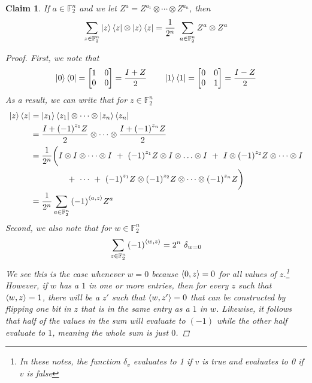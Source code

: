 \message{ !name(report_1.tex)}\documentclass[11pt]{article}
\newtheorem{claim}[thm]{Claim}
\theoremstyle{definition}
\theoremstyle{plain}
\begin{document}
\begin{claim}
If $a \in \mathbb{F}_2^n$ and we let $Z^a = Z^{a_1} \otimes \cdots \otimes Z^{a_n}$, then 
\begin{equation}\label{prelim_2}
  \sum\limits_{z \in \mathbb{F}_2^n} \ket{z} \bra{z} \otimes \ket{z} \bra{z}
  = \frac{1}{2^n} \ \sum\limits_{a \in \mathbb{F}_2^n} Z^a \otimes Z^a
\end{equation}
\begin{proof}
First, we note that
\begin{equation}
  \ket{0} \bra{0} =
  \begin{bmatrix}
    1 & 0 \\
    0 & 0 \\ 
  \end{bmatrix} = \frac{I + Z}{2} \qquad
  \ket{1} \bra{1} =
  \begin{bmatrix}
    0 & 0 \\
    0 & 1 \\ 
  \end{bmatrix} = \frac{I - Z}{2} 
\end{equation}
As a result, we can write that for $z \in \mathbb{F}_2^n$
\begin{align}
  \ket{z} \bra{z} &= \ket{z_1} \bra{z_1} \otimes \cdots \otimes 
                    \ket{z_n} \bra{z_n} \\
                  &= \frac{I + {(-1)}^{z_1} Z}{2} \otimes \cdots \otimes
                    \frac{I + {(-1)}^{z_n}Z}{2} \\
                  &= \frac{1}{2^n} \biggl(I \otimes I \otimes \cdots \otimes I
                    \ + \ {(-1)}^{z_1} Z \otimes I \otimes \ldots \otimes I
                    \ + \ I \otimes {(-1)}^{z_2} Z \otimes \cdots \otimes I
                    \nonumber \\
                  & \qquad \qquad
                    \ + \ \cdots \ + \
                    {(-1)}^{z_1} Z \otimes {(-1)}^{z_2} Z \otimes \cdots
                    \otimes {(-1)}^{z_n} Z \biggr) \\
                  &= \frac{1}{2^n} \sum\limits_{a \in \mathbb{F}_2^n}
                    {(-1)}^{\braket{a, z}} Z^a \label{prelim_4}
\end{align}
Second, we also note that for $w \in \mathbb{F}_2^n$
\begin{equation}\label{prelim_5}
  \sum\limits_{z \in \mathbb{F}_2^n} {(-1)}^{\braket{w, z}} = 2^n \ \delta_{w = 0} 
\end{equation}
We see this is the case whenever $w = 0$ because $\braket{0, z} = 0$ for all values of $z$.\footnote{In these notes, the function $\delta_{v}$ evaluates to 1 if $v$ is true and evaluates to 0 if $v$ is false} However, if $w$ has a $1$ in one or more entries, then for every $z$ such that $\braket{w, z} = 1$, there will be a $z'$ such that $\braket{w, z'} = 0$ that can be constructed by flipping one bit in $z$ that is in the same entry as a $1$ in $w$. Likewise, it follows that half of the values in the sum will evaluate to $(-1)$ while the other half evaluate to $1$, meaning the whole sum is just $0$.


\end{proof}
\end{claim}
\end{document}
